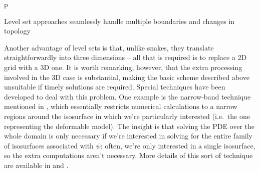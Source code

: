 \begin{stusubfig}{p}
	\hspace{4mm}%
\caption{Level set approaches seamlessly handle multiple boundaries and changes in topology}
\label{fig:background-segmentation-levelsets-topologychanges}
\end{stusubfig}

Another advantage of level sets is that, unlike snakes, they translate straightforwardly into three dimensions -- all that is required is to replace a 2D grid with a 3D one. It is worth remarking, however, that the extra processing involved in the 3D case is substantial, making the basic scheme described above unsuitable if timely solutions are required. Special techniques have been developed to deal with this problem. One example is the narrow-band technique mentioned in \cite{malladi95}, which essentially restricts numerical calculations to a narrow regions around the isosurface in which we're particularly interested (i.e.~the one representing the deformable model). The insight is that solving the PDE over the whole domain is only necessary if we're interested in solving for the entire family of isosurfaces associated with $\psi$: often, we're only interested in a single isosurface, so the extra computations aren't necessary. More details of this sort of technique are available in \cite{malladi95} and \cite{itk}.

